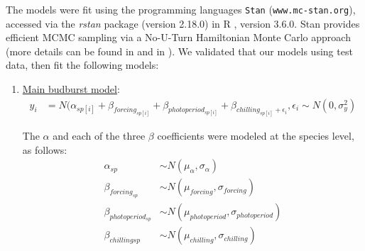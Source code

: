 \documentclass{article}
\begin{document}
\par The models were fit using the programming languages \texttt{Stan} \citep{Carpenter:2016aa}(\texttt{www.mc-stan.org}), accessed via the \textit{rstan} package (version 2.18.0) in R \citep{Rcore:2017,rstan2018}, version 3.6.0. Stan provides efficient MCMC sampling via a No-U-Turn Hamiltonian Monte Carlo approach (more details can be found in \citet{BDA} and in \citet{Carpenter:2016aa}). We validated that our models using test data, then fit the following models:
\begin{enumerate}
\item \underline{Main budburst model}:
\begin{align*}
y_i &= N(\alpha_{sp[i]} + \beta_{forcing_{sp[i]}} + \beta_{photoperiod_{sp[i]}} + \beta_{chilling_{sp[i]} + \epsilon_i}, \epsilon_i \sim N(0,\sigma^2_y)
\end{align*}

\noindent The $\alpha$ and each of the three $\beta$ coefficients were modeled at the species level, as follows:
\begin{align*}
\alpha_{sp} & \sim N(\mu_{\alpha}, \sigma_{\alpha}) \\
\beta_{forcing_{sp}} & \sim N(\mu_{forcing}, \sigma_{forcing}) \\
\beta_{photoperiod_{sp}} & \sim N(\mu_{photoperiod}, \sigma_{photoperiod})\\
\beta_{chilling{sp}} & \sim N(\mu_{chilling}, \sigma_{chilling})
\end{align*}


\end{enumerate}
\end{document}
